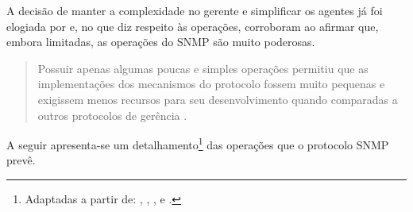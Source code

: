 \documentclass[twoside,english,brazilian]{UNISINOSmonografia}
\begin{document}
A decisão de manter a complexidade no gerente e simplificar os agentes já foi 
elogiada por  e, no que diz respeito às operações, 
 corroboram ao afirmar que, embora 
limitadas, as operações do SNMP são muito poderosas.

\begin{quote}
Possuir apenas algumas poucas e simples operações permitiu que as 
implementações dos mecanismos do protocolo fossem muito pequenas e exigissem 
menos recursos para seu desenvolvimento quando comparadas a outros protocolos 
de gerência
\cite[p.~185]{perkins1997understanding}.
\end{quote}

A seguir apresenta-se um detalhamento\footnote{
	Adaptadas a partir de:
	,
	,
	,
	 e 
	.
} das operações que o protocolo SNMP prevê. 
\end{document}
